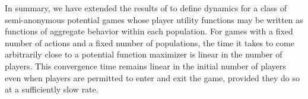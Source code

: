 \begin{example}
\FloatBarrier

\end{example}



In summary, we have extended the results of \cite{Shah2010} to define dynamics for a class of semi-anonymous potential games whose player utility functions may be written as functions of aggregate behavior within each population.  For games with a fixed number of actions and a fixed number of populations, the time it takes to come arbitrarily close to a potential function maximizer is linear in the number of players. This convergence time remains linear in the initial number of players even when players are permitted to enter and exit the game, provided they do so at a sufficiently slow rate.

